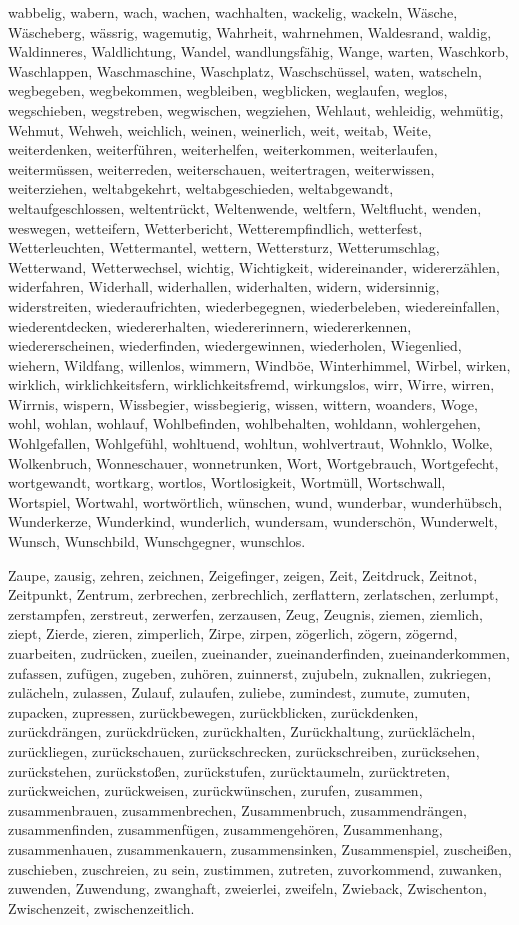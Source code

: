 \documentclass[a4paper,10pt,fleqn,twocolumn,twoside,dvipdfmx]{scrartcl}
\begin{document}
wabbelig,
wabern,
wach,
wachen,
wachhalten,
wackelig,
wackeln,
Wäsche,
Wäscheberg,
wässrig,
wagemutig,
Wahrheit,
wahrnehmen,
Waldesrand,
waldig,
Waldinneres,
Waldlichtung,
Wandel,
wandlungsfähig,
Wange,
warten,
Waschkorb,
Waschlappen,
Waschmaschine,
Waschplatz,
Waschschüssel,
waten,
watscheln,
wegbegeben,
wegbekommen,
wegbleiben,
wegblicken,
weglaufen,
weglos,
wegschieben,
wegstreben,
wegwischen,
wegziehen,
Wehlaut,
wehleidig,
wehmütig,
Wehmut,
Wehweh,
weichlich,
weinen,
weinerlich,
weit,
weitab,
Weite,
weiterdenken,
weiterführen,
weiterhelfen,
weiterkommen,
weiterlaufen,
weitermüssen,
weiterreden,
weiterschauen,
weitertragen,
weiterwissen,
weiterziehen,
weltabgekehrt,
weltabgeschieden,
weltabgewandt,
weltaufgeschlossen,
weltentrückt,
Weltenwende,
weltfern,
Weltflucht,
wenden,
weswegen,
wetteifern,
Wetterbericht,
Wetterempfindlich,
wetterfest,
Wetterleuchten,
Wettermantel,
wettern,
Wettersturz,
Wetterumschlag,
Wetterwand,
Wetterwechsel,
wichtig,
Wichtigkeit,
widereinander,
widererzählen,
widerfahren,
Widerhall,
widerhallen,
widerhalten,
widern,
widersinnig,
widerstreiten,
wiederaufrichten,
wiederbegegnen,
wiederbeleben,
wiedereinfallen,
wiederentdecken,
wiedererhalten,
wiedererinnern,
wiedererkennen,
wiedererscheinen,
wiederfinden,
wiedergewinnen,
wiederholen,
Wiegenlied,
wiehern,
Wildfang,
willenlos,
wimmern,
Windböe,
Winterhimmel,
Wirbel,
wirken,
wirklich,
wirklichkeitsfern,
wirklichkeitsfremd,
wirkungslos,
wirr,
Wirre,
wirren,
Wirrnis,
wispern,
Wissbegier,
wissbegierig,
wissen,
wittern,
woanders,
Woge,
wohl,
wohlan,
wohlauf,
Wohlbefinden,
wohlbehalten,
wohldann,
wohlergehen,
Wohlgefallen,
Wohlgefühl,
wohltuend,
wohltun,
wohlvertraut,
Wohnklo,
Wolke,
Wolkenbruch,
Wonneschauer,
wonnetrunken,
Wort,
Wortgebrauch,
Wortgefecht,
wortgewandt,
wortkarg,
wortlos,
Wortlosigkeit,
Wortmüll,
Wortschwall,
Wortspiel,
Wortwahl,
wortwörtlich,
wünschen,
wund,
wunderbar,
wunderhübsch,
Wunderkerze,
Wunderkind,
wunderlich,
wundersam,
wunderschön,
Wunderwelt,
Wunsch,
Wunschbild,
Wunschgegner,
wunschlos.

\newpage\noindent
Zaupe,
zausig,
zehren,
zeichnen,
Zeigefinger,
zeigen,
Zeit,
Zeitdruck,
Zeitnot,
Zeitpunkt,
Zentrum,
zerbrechen,
zerbrechlich,
zerflattern,
zerlatschen,
zerlumpt,
zerstampfen,
zerstreut,
zerwerfen,
zerzausen,
Zeug,
Zeugnis,
ziemen,
ziemlich,
ziept,
Zierde,
zieren,
zimperlich,
Zirpe,
zirpen,
zögerlich,
zögern,
zögernd,
zuarbeiten,
zudrücken,
zueilen,
zueinander,
zueinanderfinden,
zueinanderkommen,
zufassen,
zufügen,
zugeben,
zuhören,
zuinnerst,
zujubeln,
zuknallen,
zukriegen,
zulächeln,
zulassen,
Zulauf,
zulaufen,
zuliebe,
zumindest,
zumute,
zumuten,
zupacken,
zupressen,
zurückbewegen,
zurückblicken,
zurückdenken,
zurückdrängen,
zurückdrücken,
zurückhalten,
Zurückhaltung,
zurücklächeln,
zurückliegen,
zurückschauen,
zurückschrecken,
zurückschreiben,
zurücksehen,
zurückstehen,
zurückstoßen,
zurückstufen,
zurücktaumeln,
zurücktreten,
zurückweichen,
zurückweisen,
zurückwünschen,
zurufen,
zusammen,
zusammenbrauen,
zusammenbrechen,
Zusammenbruch,
zusammendrängen,
zusammenfinden,
zusammenfügen,
zusammengehören,
Zusammenhang,
zusammenhauen,
zusammenkauern,
zusammensinken,
Zusammenspiel,
zuscheißen,
zuschieben,
zuschreien,
zu sein,
zustimmen,
zutreten,
zuvorkommend,
zuwanken,
zuwenden,
Zuwendung,
zwanghaft,
zweierlei,
zweifeln,
Zwieback,
Zwischenton,
Zwischenzeit,
zwischenzeitlich.
\end{document}
